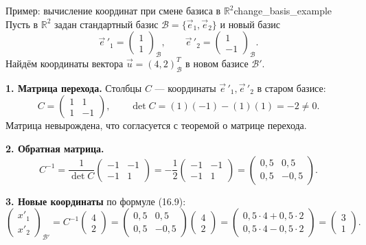 \documentclass[12pt,a4paper]{article}
\begin{document}
\begin{definition}{Пример: вычисление координат при смене
  базиса в $\mathbb{R}^2$}{change_basis_example}
  Пусть в $\mathbb{R}^2$ задан стандартный базис $\mathcal{B} =
  \{\vec{e}_1, \vec{e}_2\}$ и новый базис
  \[
    \vec{e}\,'_1 =
    \begin{pmatrix} 1 \\ 1
    \end{pmatrix}_{\mathcal{B}}, \qquad
    \vec{e}\,'_2 =
    \begin{pmatrix} 1 \\ -1
    \end{pmatrix}_{\mathcal{B}}.
  \]
  Найдём координаты вектора $\vec{u} = (4, 2)^T_{\mathcal{B}}$ в новом
  базисе $\mathcal{B}'$.

  \textbf{1. Матрица перехода.} Столбцы $C$ --- координаты $\vec{e}\,'_1,
  \vec{e}\,'_2$ в старом базисе:
  \[
    C =
    \begin{pmatrix} 1 & 1 \\ 1 & -1
    \end{pmatrix}, \qquad
    \det C = (1)(-1) - (1)(1) = -2 \neq 0.
  \]
  Матрица невырождена, что согласуется с теоремой о матрице перехода.

  \textbf{2. Обратная матрица.}
  \[
    C^{-1} = \frac{1}{\det C}
    \begin{pmatrix} -1 & -1 \\ -1 & 1
    \end{pmatrix}
    = -\frac{1}{2}
    \begin{pmatrix} -1 & -1 \\ -1 & 1
    \end{pmatrix}
    =
    \begin{pmatrix} 0{,}5 & 0{,}5 \\ 0{,}5 & -0{,}5
    \end{pmatrix}.
  \]

  \textbf{3. Новые координаты} по формуле (16.9):
  \[
    \begin{pmatrix} x'_1 \\ x'_2
    \end{pmatrix}_{\mathcal{B}'}
    = C^{-1}
    \begin{pmatrix} 4 \\ 2
    \end{pmatrix}
    =
    \begin{pmatrix} 0{,}5 & 0{,}5 \\ 0{,}5 & -0{,}5
    \end{pmatrix}
    \begin{pmatrix} 4 \\ 2
    \end{pmatrix}
    =
    \begin{pmatrix} 0{,}5\cdot 4 + 0{,}5\cdot 2 \\
      0{,}5\cdot 4 - 0{,}5\cdot 2
    \end{pmatrix}
    =
    \begin{pmatrix} 3 \\ 1
    \end{pmatrix}.
  \]


\end{definition}
\end{document}
